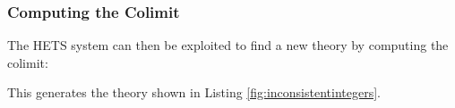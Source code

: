 \subsubsection{Computing the Colimit}
The HETS system \parencite{MossakowskiEA06} can then be exploited to
find a new theory by computing the colimit:
\begin{center}
\end{center}
This generates the theory shown in Listing \ref{fig:inconsistentintegers}.

